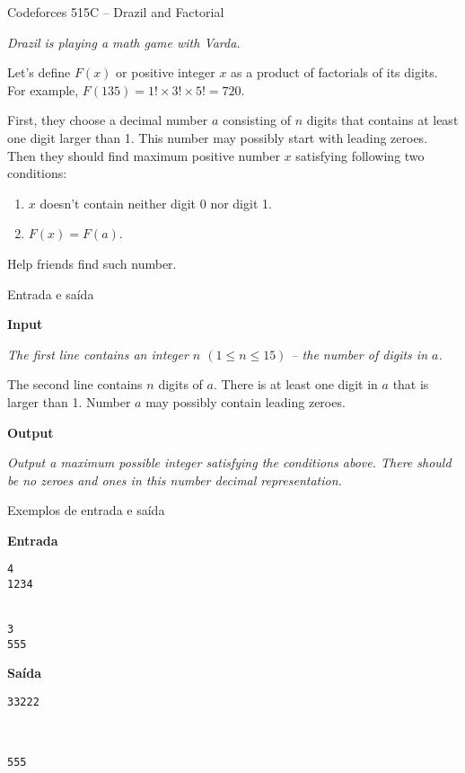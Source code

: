 \begin{frame}[fragile]{Codeforces 515C -- Drazil and Factorial}

{\it
Drazil is playing a math game with Varda.

Let's define $F(x)$ or positive integer $x$ as a product of factorials of its digits. For example, $F(135) = 1! \times 3!\times 5! = 720$.

First, they choose a decimal number $a$ consisting of $n$ digits that contains at least one digit larger than 1. This number may possibly start with leading zeroes. Then they should find maximum positive number $x$ satisfying following two conditions:

\begin{enumerate}
    \item $x$ doesn't contain neither digit 0 nor digit 1.
    \item $F(x) = F(a)$.
\end{enumerate}

Help friends find such number.
}

\end{frame}

\begin{frame}[fragile]{Entrada e saída}

\textbf{Input}

{\it
The first line contains an integer $n$ $(1 \leq n \leq 15)$ -- the number of digits in $a$.

The second line contains $n$ digits of $a$. There is at least one digit in $a$ that is larger than 1. Number $a$ may possibly contain leading zeroes.
}

\vspace{0.2in}

\textbf{Output}

{\it
Output a maximum possible integer satisfying the conditions above. There should be no zeroes and ones in this number decimal representation.
}

\end{frame}

\begin{frame}[fragile]{Exemplos de entrada e saída}

\begin{minipage}[t]{0.45\textwidth}
\textbf{Entrada}
\begin{verbatim}
4
1234


3
555
\end{verbatim}
\end{minipage}
\begin{minipage}[t]{0.5\textwidth}
\textbf{Saída}
\begin{verbatim}
33222



555
\end{verbatim}
\end{minipage}

\end{frame}



